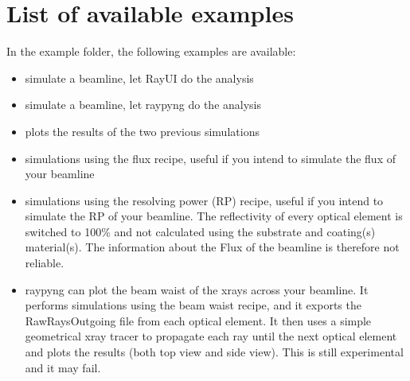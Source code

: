 \documentclass[letterpaper,10pt,english]{sphinxmanual}
\begin{document}
\section{List of available examples}
\label{\detokenize{tutorial:list-of-available-examples}}
\sphinxAtStartPar
In the example folder, the following examples are available:
\begin{itemize}
\item {} 
\sphinxAtStartPar
{} simulate a beamline,
let Ray\sphinxhyphen{}UI do the analysis

\item {} 
\sphinxAtStartPar
{}
simulate a beamline,
let raypyng do the analysis

\item {} 
\sphinxAtStartPar
{}
plots the results
of the two previous simulations

\item {} 
\sphinxAtStartPar
{}
simulations using the flux recipe,
useful if you intend to simulate the flux of your beamline

\item {} 
\sphinxAtStartPar
{}
simulations using the resolving power
(RP) recipe, useful if you intend to simulate the RP of your beamline.
The reflectivity of every optical element is switched to 100\% and not
calculated using the substrate and coating(s) material(s). The
information about the Flux of the beamline is therefore not reliable.

\item {} 
\sphinxAtStartPar
{}
raypyng can plot the beam waist of
the x\sphinxhyphen{}rays across your beamline. It performs simulations using the beam waist recipe,
and it exports the RawRaysOutgoing file from each optical element. It then uses a
simple geometrical x\sphinxhyphen{}ray tracer to propagate each ray until the next optical
element and plots the results (both top view and side view). This is still
experimental and it may fail.

\end{itemize}
\end{document}
